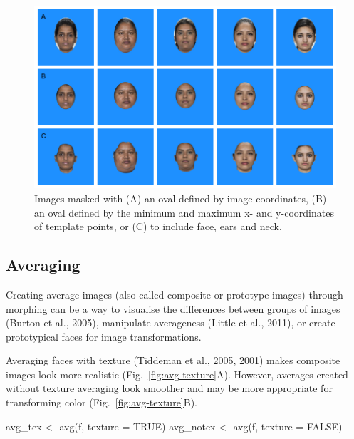 \documentclass[
  man,floatsintext]{apa6}
\newenvironment{Shaded}{\begin{snugshade}}{\end{snugshade}}
\newcommand{\AttributeTok}[1]{\textcolor[rgb]{0.77,0.63,0.00}{#1}}
\newcommand{\ConstantTok}[1]{\textcolor[rgb]{0.00,0.00,0.00}{#1}}
\newcommand{\FunctionTok}[1]{\textcolor[rgb]{0.00,0.00,0.00}{#1}}
\newcommand{\NormalTok}[1]{#1}
\newcommand{\OtherTok}[1]{\textcolor[rgb]{0.56,0.35,0.01}{#1}}
\begin{document}
\begin{figure}
\includegraphics[width=1\linewidth]{index_files/figure-latex/mask-1} \caption{Images masked with (A) an oval defined by image coordinates, (B) an oval defined by the minimum and maximum x- and y-coordinates of template points, or (C) to include face, ears and neck.}\label{fig:mask}
\end{figure}

\hypertarget{averaging}{%
\subsection{Averaging}\label{averaging}}

Creating average images (also called composite or prototype images) through morphing can be a way to visualise the differences between groups of images (Burton et al., 2005), manipulate averageness (Little et al., 2011), or create prototypical faces for image transformations.

Averaging faces with texture (Tiddeman et al., 2005, 2001) makes composite images look more realistic (Fig.~\ref{fig:avg-texture}A). However, averages created without texture averaging look smoother and may be more appropriate for transforming color (Fig.~\ref{fig:avg-texture}B).

\begin{Shaded}
\begin{Highlighting}[]
\NormalTok{avg\_tex }\OtherTok{\textless{}{-}} \FunctionTok{avg}\NormalTok{(f, }\AttributeTok{texture =} \ConstantTok{TRUE}\NormalTok{)}
\NormalTok{avg\_notex }\OtherTok{\textless{}{-}} \FunctionTok{avg}\NormalTok{(f, }\AttributeTok{texture =} \ConstantTok{FALSE}\NormalTok{)}
\end{Highlighting}
\end{Shaded}
\end{document}
